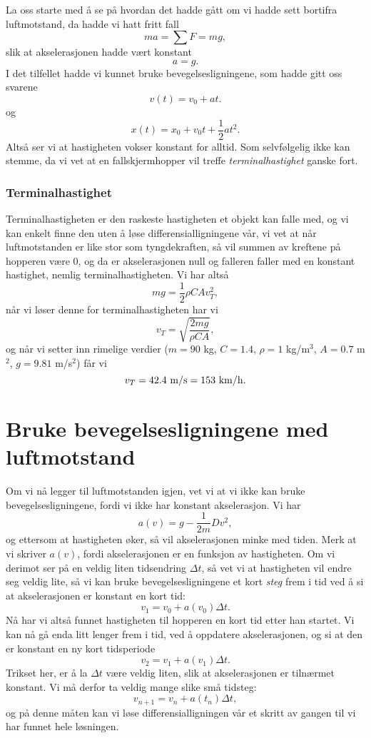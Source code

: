\documentclass[a4paper, 11pt, notitlepage, english]{article}
\begin{document}
La oss starte med å se på hvordan det hadde gått om vi hadde sett bortifra luftmotstand, da hadde vi hatt fritt fall
$$ma = \sum F = mg,$$
slik at akselerasjonen hadde vært konstant
$$a = g.$$
I det tilfellet hadde vi kunnet bruke bevegelsesligningene, som hadde gitt oss svarene
$$v(t) = v_0 + at.$$
og 
$$x(t) = x_0 + v_0 t + \frac{1}{2}at^2.$$
Altså ser vi at hastigheten vokser konstant for alltid. Som selvfølgelig ikke kan stemme, da vi vet at en fallskjermhopper vil treffe \emph{terminalhastighet} ganske fort.

\subsubsection*{Terminalhastighet}
Terminalhastigheten er den raskeste hastigheten et objekt kan falle med, og vi kan enkelt finne den uten å løse differensialligningene vår, vi vet at når luftmotstanden er like stor som tyngdekraften, så vil summen av kreftene på hopperen være 0, og da er akselerasjonen null og falleren faller med en konstant hastighet, nemlig terminalhastigheten. Vi har altså
$$mg = \frac{1}{2}\rho C A v_T^2,$$
når vi løser denne for terminalhastigheten har vi
$$v_T = \sqrt{\frac{2mg}{\rho C A}},$$
og når vi setter inn rimelige verdier ($m=90$ kg, $C=1.4$, $\rho=1$ kg/m$^3$, $A=0.7$ m$^2$, $g=9.81$ m/s$^2$) får vi
$$v_T = 42.4 {\rm\ m/s} = 153 {\rm\ km/h}.$$

\section{Bruke bevegelsesligningene med luftmotstand}
Om vi nå legger til luftmotstanden igjen, vet vi at vi ikke kan bruke bevegelsesligningene, fordi vi ikke har konstant akselerasjon. Vi har
$$a(v) = g - \frac{1}{2m}Dv^2,$$
og ettersom at hastigheten øker, så vil akselerasjonen minke med tiden. Merk at vi skriver $a(v)$, fordi akselerasjonen er en funksjon av hastigheten. Om vi derimot ser på en veldig liten tidsendring $\Delta t$, så vet vi at hastigheten vil endre seg veldig lite, så vi kan bruke bevegelsesligningene et kort \emph{steg} frem i tid ved å si at akselerasjonen er konstant en kort tid:
$$v_1 = v_0 + a(v_0)\Delta t.$$
Nå har vi altså funnet hastigheten til hopperen en kort tid etter han startet. Vi kan nå gå enda litt lenger frem i tid, ved å oppdatere akselerasjonen, og si at den er konstant en ny kort tidsperiode
$$v_2 = v_1 + a(v_1)\Delta t.$$
Trikset her, er å la $\Delta t$ være veldig liten, slik at akselerasjonen er tilnærmet konstant. Vi må derfor ta veldig mange slike små tidsteg:
$$v_{n+1} = v_n + a(t_n)\Delta t,$$
og på denne måten kan vi løse differensialligningen vår et skritt av gangen til vi har funnet hele løsningen.
\end{document}
